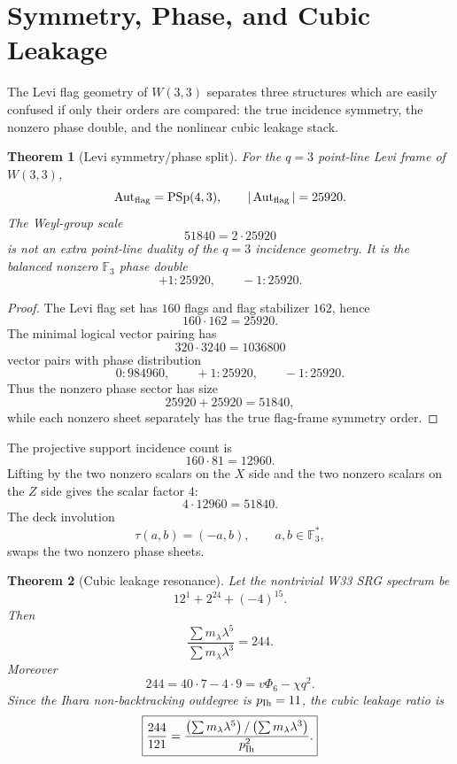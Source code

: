 \documentclass[12pt,a4paper]{article}
\newtheorem{theorem}{Theorem}[section]
\begin{document}






\section{Symmetry, Phase, and Cubic Leakage}
\label{sec:symmetry-phase-cubic-leakage}

The Levi flag geometry of $W(3,3)$ separates three structures which are easily
confused if only their orders are compared: the true incidence symmetry, the
nonzero phase double, and the nonlinear cubic leakage stack.

\begin{theorem}[Levi symmetry/phase split]
For the $q=3$ point-line Levi frame of $W(3,3)$,
\[
\operatorname{Aut}_{\rm flag}=\mathrm{PSp}(4,3),
\qquad
|\operatorname{Aut}_{\rm flag}|=25920.
\]
The Weyl-group scale
\[
51840=2\cdot25920
\]
is not an extra point-line duality of the $q=3$ incidence geometry.  It is the
balanced nonzero $\mathbb F_3$ phase double
\[
+1:25920,
\qquad
-1:25920.
\]
\end{theorem}

\begin{proof}
The Levi flag set has $160$ flags and flag stabilizer $162$, hence
\[
160\cdot162=25920.
\]
The minimal logical vector pairing has
\[
320\cdot3240=1036800
\]
vector pairs with phase distribution
\[
0:984960,
\qquad
+1:25920,
\qquad
-1:25920.
\]
Thus the nonzero phase sector has size
\[
25920+25920=51840,
\]
while each nonzero sheet separately has the true flag-frame symmetry order.
\end{proof}

The projective support incidence count is
\[
160\cdot81=12960.
\]
Lifting by the two nonzero scalars on the $X$ side and the two nonzero scalars
on the $Z$ side gives the scalar factor $4$:
\[
4\cdot12960=51840.
\]
The deck involution
\[
\tau(a,b)=(-a,b),
\qquad a,b\in\mathbb F_3^*,
\]
swaps the two nonzero phase sheets.

\begin{theorem}[Cubic leakage resonance]
Let the nontrivial W33 SRG spectrum be
\[
12^1+2^{24}+(-4)^{15}.
\]
Then
\[
\frac{\sum m_\lambda\lambda^5}{\sum m_\lambda\lambda^3}=244.
\]
Moreover
\[
244=40\cdot7-4\cdot9=v\Phi_6-\chi q^2.
\]
Since the Ihara non-backtracking outdegree is $p_{\rm Ih}=11$, the cubic leakage
ratio is
\[
\boxed{
\frac{244}{121}=
\frac{\left(\sum m_\lambda\lambda^5\right)/\left(\sum m_\lambda\lambda^3\right)}{p_{\rm Ih}^2}.
}
\]
\end{theorem}
\end{document}

